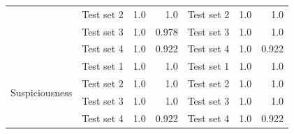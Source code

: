 \begin{table}[h]
\begin{tabular}{|r|r|r|r|r|r|r|}
                                                                                                                                 & Test set 2                   & 1.0                            & 1.0                         & Test set 2                   & 1.0                            & 1.0                         \\ \cline{2-7} 
                                                                                                                                 & Test set 3                   & 1.0                            & 0.978                       & Test set 3                   & 1.0                            & 1.0                         \\ \cline{2-7} 
                                                                                                                                 & Test set 4                   & 1.0                            & 0.922                       & Test set 4                   & 1.0                            & 0.922                       \\ \hline
\multirow{4}{*}{Suspiciousness}                                                                                                  & Test set 1                   & 1.0                            & 1.0                         & Test set 1                   & 1.0                            & 1.0                         \\ \cline{2-7} 
                                                                                                                                 & Test set 2                   & 1.0                            & 1.0                         & Test set 2                   & 1.0                            & 1.0                         \\ \cline{2-7} 
                                                                                                                                 & Test set 3                   & 1.0                            & 1.0                         & Test set 3                   & 1.0                            & 1.0                         \\ \cline{2-7} 
                                                                                                                                 & Test set 4                   & 1.0                            & 0.922                       & Test set 4                   & 1.0                            & 0.922                       \\ \hline
\end{tabular}
\end{table}

